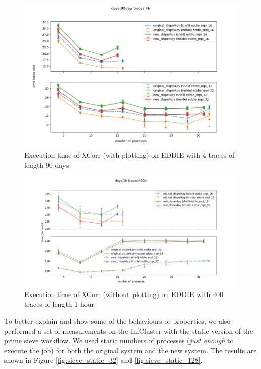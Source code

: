 \begin{figure}[h]
\centering
    \includegraphics[width=1.10\textwidth]{figures/xcorr_eddie_90day_4tr}
\caption{Execution time of XCorr (with plotting) on EDDIE with 4 traces of length 90 days}
\label{fig:xcorr_eddie}
\end{figure}

\begin{figure}[h]
\centering
    \includegraphics[width=1\textwidth]{figures/xcorr_eddie_1h_400tr}
\caption{Execution time of XCorr (without plotting) on EDDIE with 400 traces of length 1 hour}
\label{fig:xcorr_eddie_400}
\end{figure}

To better explain and show some of the behaviours or properties, we also performed a set of measurements on the InfCluster with the static version of the prime sieve workflow. We used static numbers of processes (\emph{just enough} to execute the job) for both the original system and the new system. The results are shown in Figure  \ref{fig:sieve_static_32} and \ref{fig:sieve_static_128}.

